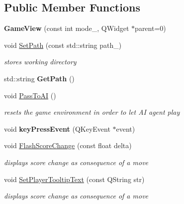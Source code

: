 \subsection*{Public Member Functions}
\begin{DoxyCompactItemize}
\item 
{\bfseries Game\+View} (const int mode\+\_\+, Q\+Widget $\ast$parent=0)\hypertarget{class_game_view_a10ff55ad9e283fc42d4a1eecfe6ee2d8}{}\label{class_game_view_a10ff55ad9e283fc42d4a1eecfe6ee2d8}

\item 
void \hyperlink{class_game_view_ab44f4473d1292b3e67bff57cf04138d7}{Set\+Path} (const std\+::string path\+\_\+)
\begin{DoxyCompactList}\small\item\em stores working directory \end{DoxyCompactList}\item 
std\+::string {\bfseries Get\+Path} ()\hypertarget{class_game_view_a26dcec76a5c6778b4f61c972e1675089}{}\label{class_game_view_a26dcec76a5c6778b4f61c972e1675089}

\item 
void \hyperlink{class_game_view_a61fff3c00a8b13002e3b0efffb1e9ad0}{Pass\+To\+AI} ()\hypertarget{class_game_view_a61fff3c00a8b13002e3b0efffb1e9ad0}{}\label{class_game_view_a61fff3c00a8b13002e3b0efffb1e9ad0}

\begin{DoxyCompactList}\small\item\em resets the game environment in order to let AI agent play \end{DoxyCompactList}\item 
void {\bfseries key\+Press\+Event} (Q\+Key\+Event $\ast$event)\hypertarget{class_game_view_ab8244fb1cf987e1eb91d62968b3d2cfd}{}\label{class_game_view_ab8244fb1cf987e1eb91d62968b3d2cfd}

\item 
void \hyperlink{class_game_view_a7d840226c0e3d25380081cede750ce5b}{Flash\+Score\+Change} (const float delta)
\begin{DoxyCompactList}\small\item\em displays score change as consequence of a move \end{DoxyCompactList}\item 
void \hyperlink{class_game_view_adf946f732dca534a0af220d728fd1a22}{Set\+Player\+Tooltip\+Text} (const Q\+String str)
\begin{DoxyCompactList}\small\item\em displays score change as consequence of a move \end{DoxyCompactList}\end{DoxyCompactItemize}
